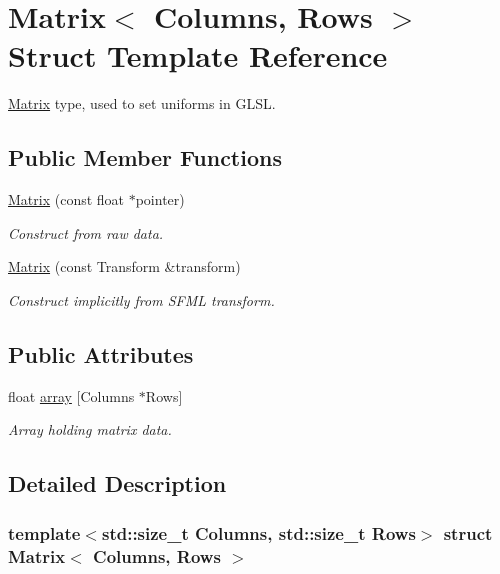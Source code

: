 \hypertarget{struct_matrix}{}\section{Matrix$<$ Columns, Rows $>$ Struct Template Reference}
\label{struct_matrix}


\hyperlink{struct_matrix}{Matrix} type, used to set uniforms in G\+L\+SL.  


\subsection*{Public Member Functions}
\begin{DoxyCompactItemize}
\item 
\hyperlink{struct_matrix_ad40da72f526bcd6854d83496d2f62e01}{Matrix} (const float $\ast$pointer)
\begin{DoxyCompactList}\small\item\em Construct from raw data. \end{DoxyCompactList}\item 
\hyperlink{struct_matrix_acc8ec3ddfe33a01f9ae7970d8fed9855}{Matrix} (const Transform \&transform)
\begin{DoxyCompactList}\small\item\em Construct implicitly from S\+F\+ML transform. \end{DoxyCompactList}\end{DoxyCompactItemize}
\subsection*{Public Attributes}
\begin{DoxyCompactItemize}
\item 
\mbox{\label{struct_matrix_a494cc3a7a34398ec21992ba83018d9f4}} 
float \hyperlink{struct_matrix_a494cc3a7a34398ec21992ba83018d9f4}{array} \mbox{[}Columns $\ast$Rows\mbox{]}
\begin{DoxyCompactList}\small\item\em Array holding matrix data. \end{DoxyCompactList}\end{DoxyCompactItemize}


\subsection{Detailed Description}
\subsubsection*{template$<$std\+::size\+\_\+t Columns, std\+::size\+\_\+t Rows$>$\newline
struct Matrix$<$ Columns, Rows $>$}

